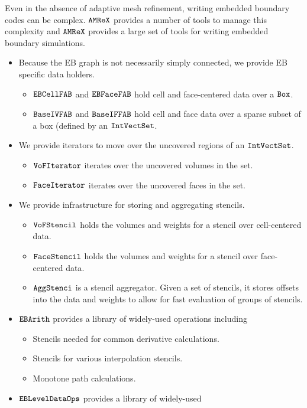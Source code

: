 Even in the absence of adaptive mesh refinement, writing embedded
boundary codes can be complex.    $\tt{AMReX}$ provides a number of
tools to manage this complexity and 
$\tt{AMReX}$ provides a large set of tools for writing embedded
boundary simulations.
\begin{itemize}
\item  Because the EB graph is not necessarily simply connected, we
  provide EB specific data holders.
\begin{itemize}
  \item $\tt{EBCellFAB}$ and $\tt{EBFaceFAB}$ hold cell and
    face-centered data over a $\tt{Box}$.
   \item $\tt{BaseIVFAB}$ and $\tt{BaseIFFAB}$ hold cell and face
     data over a sparse subset of a box (defined by an
     $\tt{IntVectSet}$.
\end{itemize}
\item We provide iterators to move over the uncovered regions of an $\tt{IntVectSet}$.
\begin{itemize}
  \item $\tt{VoFIterator}$ iterates over the uncovered volumes in the set.
  \item $\tt{FaceIterator}$ iterates over the uncovered faces in the set. 
\end{itemize}
\item We provide infrastructure for storing and aggregating stencils.
\begin{itemize}
  \item $\tt{VoFStencil}$ holds the volumes and weights for a
    stencil over cell-centered data.
  \item $\tt{FaceStencil}$ holds the volumes and weights for a
    stencil over face-centered data.
  \item $\tt{AggStenci}$ is a stencil aggregator.   Given a set of
    stencils, it stores offsets into the data and weights to allow for
    fast evaluation of groups of stencils.
\end{itemize}
\item $\tt{EBArith}$ provides a library of widely-used operations including
\begin{itemize}
  \item Stencils needed for common derivative calculations.
  \item Stencils for various interpolation stencils.
  \item Monotone path calculations.
\end{itemize}
\item $\tt{EBLevelDataOps}$ provides a library of widely-used

\end{itemize}
